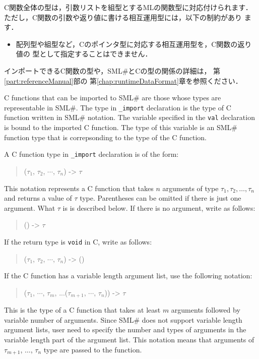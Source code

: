 \documentclass{jbook}
\newcommand{\smlsharp}{SML\#}
\newenvironment{program}{\begin{quote}\begin{tt}}%
                        {\end{tt}\end{quote}}
\begin{document}
	C関数全体の型は，引数リストを組型とするMLの関数型に対応付けられます．
	ただし，C関数の引数や返り値に書ける相互運用型には，以下の制約があり
ます．
\begin{itemize}
\item 配列型や組型など，Cのポインタ型に対応する相互運用型を，C関数の返り値の
型として指定することはできません．
\end{itemize}

	インポートできるC関数の型や，\smlsharp{}とCの型の関係の詳細は，
第\ref{part:referenceManual}部の
第\ref{chap:runtimeDataFormat}章を参照ください．


\else%

	C functions that can be imported to \smlsharp{} are those whose
types are representable in \smlsharp{}.
	The type in {\tt \_import} declaration is the type of C function
written in \smlsharp{} notation.
	The variable specified in the {\tt val} declaration is bound
to the imported C function.
	The type of this variable is an \smlsharp{} function type
that is correpsonding to the type of the C function.

	A C function type in {\tt \_import} declaration is of the form:
\begin{program}
($\tau_1$, $\tau_2$, $\cdots$, $\tau_n$) -> $\tau$
\end{program}
	This notation represents a C function that takes $n$ arguments
of type $\tau_1, \tau_2, \ldots, \tau_n$ and returns a value of $\tau$ type.
	Parentheses can be omitted if there is just one argument.
	What $\tau$ is is described below.
        If there is no argument, write as follows:
\begin{program}
() -> $\tau$
\end{program}
	If the return type is {\tt void} in C, write as follows:
\begin{program}
($\tau_1$, $\tau_2$, $\cdots$, $\tau_n$) -> ()
\end{program}
	If the C function has a variable length argument list, use the
following notation:
\begin{program}
($\tau_1$, $\cdots$, $\tau_m$, ...($\tau_{m+1}$, $\cdots$, $\tau_{n}$)) -> $\tau$
\end{program}
	This is the type of a C function that takes at least $m$ arguments
followed by variable number of arguments.
	Since \smlsharp{} does not support variable length argument lists,
user need to specify the number and types of arguments in the variable
length part of the argument list.
	This notation means that arguments of $\tau_{m+1}$, $\ldots$, $\tau_{n}$
type are passed to the function.
\end{document}
